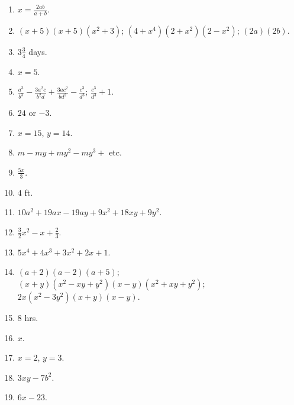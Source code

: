 \documentclass{book}
\begin{document}
\begin{enumerate}
\item $\displaystyle x=\frac{2ab}{a+b}$.

\item $(x+5)(x+5)(x^2+3)$; $(4+x^4)(2+x^2)(2-x^2)$; $(2a)(2b)$.

\item $3\frac{3}{4}$ days.

\item $x=5$.

\item $\displaystyle
\frac{a^3}{b^3}-\frac{3a^2c}{b^2d}+\frac{3ac^2}{bd^2}-\frac{c^3}{d^3}
$; $\displaystyle \frac{c^3}{d^3}+1$. \item $24$ or $-3$. \item
$x=15$, $y=14$. \item $m-my+my^2-my^3+$ etc. \item $\displaystyle
\frac{5x}{3}$. \item $4$ ft. \item
$10a^2+19ax-19ay+9x^2+18xy+9y^2$. \item
$\frac{3}{2}x^2-x+\frac{2}{3}$. \item $5x^4+4x^3+3x^2+2x+1$. \item
$(a+2)(a-2)(a+5) $; $(x+y)(x^2-xy+y^2)(x-y)(x^2+xy+y^2) $;
$2x(x^2-3y^2)(x+y)(x-y)$. \item $8$ hrs. \item $x$. \item $x=2$,
$y=3$. \item $3xy-7b^2$. \item $6x-23$.
\end{enumerate}
\end{document}
